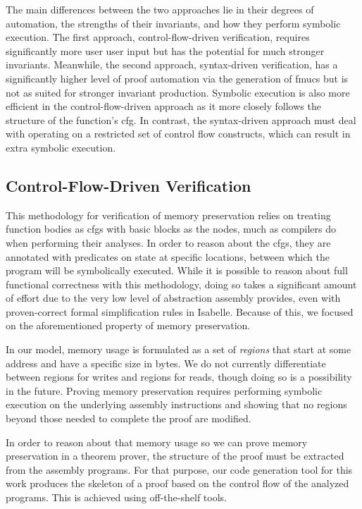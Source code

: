 The main differences between the two approaches
lie in their degrees of automation, the strengths of their invariants,
and how they perform symbolic execution.
The first approach, control-flow-driven verification,
requires significantly more user user input but has the potential for much stronger invariants.
Meanwhile, the second approach, syntax-driven verification,
has a significantly higher level of proof automation via the generation of \acp{fmuc}
but is not as suited for stronger invariant production.
Symbolic execution is also more efficient in the control-flow-driven approach
as it more closely follows the structure of the function's \ac{cfg}.
In contrast, the syntax-driven approach must deal with
operating on a restricted set of control flow constructs,
which can result in extra symbolic execution.

\subsection{Control-Flow-Driven Verification}
This methodology for verification of memory preservation relies on treating function bodies
as \acp{cfg} with basic blocks as the nodes,
much as compilers do when performing their analyses.
In order to reason about the \acp{cfg},
they are annotated with predicates on state at specific locations,
between which the program will be symbolically executed.
While it is possible to reason about full functional correctness with this methodology,
doing so takes a significant amount of effort due to the very low level of abstraction
assembly provides, even with proven-correct formal simplification rules in Isabelle.
Because of this, we focused on the aforementioned property of memory preservation.

In our model, memory usage is formulated as a set of \emph{regions}
that start at some address and have a specific size in bytes.
We do not currently differentiate between regions for writes and regions for reads,
though doing so is a possibility in the future.
Proving memory preservation requires performing symbolic execution
on the underlying assembly instructions
and showing that no regions beyond those needed to complete the proof are modified.

In order to reason about that memory usage
so we can prove memory preservation in a theorem prover,
the structure of the proof must be extracted from the assembly programs.
For that purpose,
our code generation tool for this work produces the skeleton of a proof
based on the control flow of the analyzed programs.
This is achieved using off-the-shelf tools.

